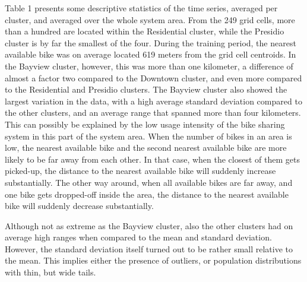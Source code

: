 \documentclass[12pt,oneside]{reedthesis}
\begin{document}
Table 1 presents some descriptive statistics of the time series,
averaged per cluster, and averaged over the whole system area. From the
249 grid cells, more than a hundred are located within the Residential
cluster, while the Presidio cluster is by far the smallest of the four.
During the training period, the nearest available bike was on average
located 619 meters from the grid cell centroids. In the Bayview cluster,
however, this was more than one kilometer, a difference of almost a
factor two compared to the Downtown cluster, and even more compared to
the Residential and Presidio clusters. The Bayview cluster also showed
the largest variation in the data, with a high average standard
deviation compared to the other clusters, and an average range that
spanned more than four kilometers. This can possibly be explained by the
low usage intensity of the bike sharing system in this part of the
system area. When the number of bikes in an area is low, the nearest
available bike and the second nearest available bike are more likely to
be far away from each other. In that case, when the closest of them gets
picked-up, the distance to the nearest available bike will suddenly
increase substantially. The other way around, when all available bikes
are far away, and one bike gets dropped-off inside the area, the
distance to the nearest available bike will suddenly decrease
substantially.

Although not as extreme as the Bayview cluster, also the other clusters
had on average high ranges when compared to the mean and standard
deviation. However, the standard deviation itself turned out to be
rather small relative to the mean. This implies either the presence of
outliers, or population distributions with thin, but wide tails.
\end{document}
